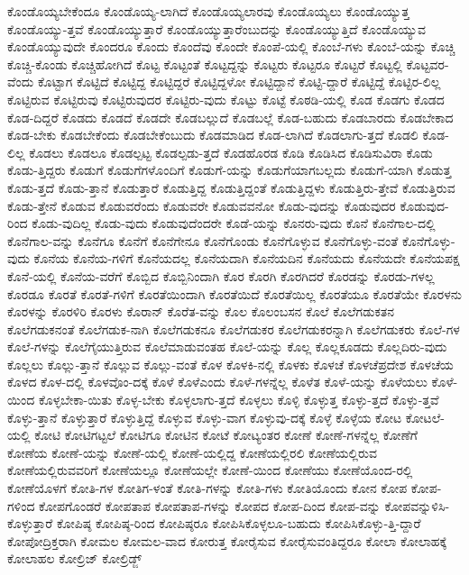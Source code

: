 {ಕೊಂಡೊಯ್ಯಬೇಕೆಂದೂ
ಕೊಂಡೊಯ್ಯ-ಲಾಗಿದೆ
ಕೊಂಡೊಯ್ಯಲಾರವು
ಕೊಂಡೊಯ್ಯಲು
ಕೊಂಡೊಯ್ಯುತ್ತ
ಕೊಂಡೊಯ್ಯು-ತ್ತವೆ
ಕೊಂಡೊಯ್ಯುತ್ತಾರೆ
ಕೊಂಡೊಯ್ಯುತ್ತಾರೆಂಬುದನ್ನು
ಕೊಂಡೊಯ್ಯುತ್ತಿದೆ
ಕೊಂಡೊಯ್ಯುವ
ಕೊಂಡೊಯ್ಯುವುದೇ
ಕೊಂದರೂ
ಕೊಂದು
ಕೊಂದೆವು
ಕೊಂದೇ
ಕೊಂಪೆ-ಯಲ್ಲಿ
ಕೊಂಬೆ-ಗಳು
ಕೊಂಬೆ-ಯನ್ನು
ಕೊಚ್ಚಿ
ಕೊಚ್ಚಿ-ಕೊಂಡು
ಕೊಚ್ಚಿಹೋಗಿದೆ
ಕೊಟ್ಟ
ಕೊಟ್ಟಂತೆ
ಕೊಟ್ಟದ್ದನ್ನು
ಕೊಟ್ಟರು
ಕೊಟ್ಟರೂ
ಕೊಟ್ಟರೆ
ಕೊಟ್ಟಲ್ಲಿ
ಕೊಟ್ಟವರ-ವೆಂದು
ಕೊಟ್ಟಾಗ
ಕೊಟ್ಟಿದೆ
ಕೊಟ್ಟಿದ್ದ
ಕೊಟ್ಟಿದ್ದರೆ
ಕೊಟ್ಟಿದ್ದಳೋ
ಕೊಟ್ಟಿದ್ದಾನೆ
ಕೊಟ್ಟಿ-ದ್ದಾರೆ
ಕೊಟ್ಟಿದ್ದೆ
ಕೊಟ್ಟಿರ-ಲಿಲ್ಲ
ಕೊಟ್ಟಿರುವ
ಕೊಟ್ಟಿರುವು
ಕೊಟ್ಟಿರುವುದರ
ಕೊಟ್ಟಿರು-ವುದು
ಕೊಟ್ಟು
ಕೊಟ್ಟೆ
ಕೊಠಡಿ-ಯಲ್ಲಿ
ಕೊಡ
ಕೊಡಗು
ಕೊಡದ
ಕೊಡ-ದಿದ್ದರೆ
ಕೊಡದು
ಕೊಡದೆ
ಕೊಡದೇ
ಕೊಡಬಲ್ಲುದೆ
ಕೊಡಬಲ್ಲೆ
ಕೊಡ-ಬಹುದು
ಕೊಡಬಾರದು
ಕೊಡಬೇಕಾದ
ಕೊಡ-ಬೇಕು
ಕೊಡಬೇಕೆಂದು
ಕೊಡಬೇಕೆಂಬುದು
ಕೊಡಮಾಡಿದ
ಕೊಡ-ಲಾಗಿದೆ
ಕೊಡಲಾಗು-ತ್ತದೆ
ಕೊಡಲಿ
ಕೊಡ-ಲಿಲ್ಲ
ಕೊಡಲು
ಕೊಡಲೂ
ಕೊಡಲ್ಪಟ್ಟ
ಕೊಡಲ್ಪಡು-ತ್ತದೆ
ಕೊಡಹೊರಡ
ಕೊಡಿ
ಕೊಡಿಸಿದ
ಕೊಡಿಸುವಿರಾ
ಕೊಡು
ಕೊಡು-ತ್ತಿದ್ದರು
ಕೊಡುಗೆ
ಕೊಡುಗೆಗಳೊಂದಿಗೆ
ಕೊಡುಗೆ-ಯನ್ನು
ಕೊಡುಗೆಯಾಗಬಲ್ಲದು
ಕೊಡುಗೆ-ಯಾಗಿ
ಕೊಡುತ್ತ
ಕೊಡು-ತ್ತದೆ
ಕೊಡು-ತ್ತಾನೆ
ಕೊಡುತ್ತಾರೆ
ಕೊಡುತ್ತಿದ್ದ
ಕೊಡುತ್ತಿದ್ದಂತೆ
ಕೊಡುತ್ತಿದ್ದಳು
ಕೊಡುತ್ತಿರು-ತ್ತೇವೆ
ಕೊಡುತ್ತಿರುವ
ಕೊಡು-ತ್ತೇನೆ
ಕೊಡುವ
ಕೊಡುವರೆಂದು
ಕೊಡುವರೇ
ಕೊಡುವವನೋ
ಕೊಡು-ವುದನ್ನು
ಕೊಡುವುದರ
ಕೊಡುವುದ-ರಿಂದ
ಕೊಡು-ವುದಿಲ್ಲ
ಕೊಡು-ವುದು
ಕೊಡುವುದೆಂದರೇ
ಕೊಡೆ-ಯನ್ನು
ಕೊನರು-ವುದು
ಕೊನೆ
ಕೊನೆಗಾಲ-ದಲ್ಲಿ
ಕೊನೆಗಾಲ-ವನ್ನು
ಕೊನೆಗೂ
ಕೊನೆಗೆ
ಕೊನೆಗೇನೂ
ಕೊನೆಗೊಂಡು
ಕೊನೆಗೊಳ್ಳುವ
ಕೊನೆಗೊಳ್ಳು-ವಂತೆ
ಕೊನೆಗೊಳ್ಳು-ವುದು
ಕೊನೆಯ
ಕೊನೆಯ-ಗಳಿಗೆ
ಕೊನೆಯದಲ್ಲ
ಕೊನೆಯದಾಗಿ
ಕೊನೆಯದಿನ
ಕೊನೆಯದು
ಕೊನೆಯದೇ
ಕೊನೆಯಪಕ್ಷ
ಕೊನೆ-ಯಲ್ಲಿ
ಕೊನೆಯ-ವರೆಗೆ
ಕೊಬ್ಬಿದ
ಕೊಬ್ಬಿನಿಂದಾಗಿ
ಕೊರ
ಕೊರಗಿ
ಕೊರಗಿದರೆ
ಕೊರಡನ್ನು
ಕೊರಡು-ಗಳಲ್ಲ
ಕೊರಡೂ
ಕೊರತೆ
ಕೊರತೆ-ಗಳಿಗೆ
ಕೊರತೆಯಿಂದಾಗಿ
ಕೊರತೆಯಿದೆ
ಕೊರತೆಯಿಲ್ಲ
ಕೊರತೆಯೂ
ಕೊರತೆಯೇ
ಕೊರಳನು
ಕೊರಳನ್ನು
ಕೊರಳಿರಿ
ಕೊರಳು
ಕೊರಾನ್
ಕೊರೆತ-ವನ್ನು
ಕೊಲ
ಕೊಲಂಬಸನ
ಕೊಲೆ
ಕೊಲೆಗಡುಕತನ
ಕೊಲೆಗಡುಕನಂತೆ
ಕೊಲೆಗಡುಕ-ನಾಗಿ
ಕೊಲೆಗಡುಕನೂ
ಕೊಲೆಗಡುಕರ
ಕೊಲೆಗಡುಕರನ್ನಾಗಿ
ಕೊಲೆಗಡುಕರು
ಕೊಲೆ-ಗಳ
ಕೊಲೆ-ಗಳನ್ನು
ಕೊಲೆಗೈಯುತ್ತಿರುವ
ಕೊಲೆಮಾಡುವಂತಹ
ಕೊಲೆ-ಯನ್ನು
ಕೊಲ್ಲ
ಕೊಲ್ಲಕೂಡದು
ಕೊಲ್ಲದಿರು-ವುದು
ಕೊಲ್ಲಲು
ಕೊಲ್ಲು-ತ್ತಾನೆ
ಕೊಲ್ಲುವ
ಕೊಲ್ಲು-ವಂತೆ
ಕೊಳ
ಕೊಳಕಿ-ನಲ್ಲಿ
ಕೊಳಕು
ಕೊಳಚೆ
ಕೊಳಚೆಪ್ರದೇಶ
ಕೊಳಚೆಯ
ಕೊಳದ
ಕೊಳ-ದಲ್ಲಿ
ಕೊಳವೊಂ-ದಕ್ಕೆ
ಕೊಳೆ
ಕೊಳೆಎಂದು
ಕೊಳೆ-ಗಳನ್ನೆಲ್ಲ
ಕೊಳೆತ
ಕೊಳೆ-ಯನ್ನು
ಕೊಳೆಯಲು
ಕೊಳೆ-ಯಿಂದ
ಕೊಳ್ಳಬೇಕಾ-ಯಿತು
ಕೊಳ್ಳ-ಬೇಕು
ಕೊಳ್ಳಲಾಗು-ತ್ತದೆ
ಕೊಳ್ಳಲು
ಕೊಳ್ಳಿ
ಕೊಳ್ಳುತ್ತ
ಕೊಳ್ಳು-ತ್ತದೆ
ಕೊಳ್ಳು-ತ್ತವೆ
ಕೊಳ್ಳು-ತ್ತಾನೆ
ಕೊಳ್ಳುತ್ತಾರೆ
ಕೊಳ್ಳುತ್ತಿದ್ದೆ
ಕೊಳ್ಳುವ
ಕೊಳ್ಳು-ವಾಗ
ಕೊಳ್ಳುವು-ದಕ್ಕೆ
ಕೊಳ್ಳೆ
ಕೊಳ್ಳೆಯ
ಕೋಟ
ಕೋಟಲೆ-ಯಲ್ಲಿ
ಕೋಟಿ
ಕೋಟಿಗಟ್ಟಲೆ
ಕೋಟಿಗೂ
ಕೋಟಿನ
ಕೋಟೆ
ಕೋಟ್ಯಂತರ
ಕೋಣೆ
ಕೋಣೆ-ಗಳನ್ನೆಲ್ಲ
ಕೋಣೆಗೆ
ಕೋಣೆಯ
ಕೋಣೆ-ಯನ್ನು
ಕೋಣೆ-ಯಲ್ಲಿ
ಕೋಣೆ-ಯಲ್ಲಿದ್ದ
ಕೋಣೆಯಲ್ಲಿರಲಿ
ಕೋಣೆಯಲ್ಲಿರುವ
ಕೋಣೆಯಲ್ಲಿರುವವರಿಗೆ
ಕೋಣೆಯಲ್ಲೂ
ಕೋಣೆಯಲ್ಲೇ
ಕೋಣೆ-ಯಿಂದ
ಕೋಣೆಯು
ಕೋಣೆಯೊಂದ-ರಲ್ಲಿ
ಕೋಣೆಯೊಳಗೆ
ಕೋತಿ-ಗಳ
ಕೋತಿಗ-ಳಂತೆ
ಕೋತಿ-ಗಳನ್ನು
ಕೋತಿ-ಗಳು
ಕೋತಿಯೊಂದು
ಕೋನ
ಕೋಪ
ಕೋಪ-ಗಳಿಂದ
ಕೋಪಗೊಂಡರೆ
ಕೋಪತಾಪ
ಕೋಪತಾಪ-ಗಳನ್ನು
ಕೋಪದ
ಕೋಪ-ದಿಂದ
ಕೋಪ-ವನ್ನು
ಕೋಪವನ್ನುಳಿಸಿ-ಕೊಳ್ಳುತ್ತಾರೆ
ಕೋಪಿಷ್ಠ
ಕೋಪಿಷ್ಠ-ರಿಂದ
ಕೋಪಿಷ್ಠರೂ
ಕೋಪಿಸಿಕೊಳ್ಳಲೂ-ಬಹುದು
ಕೋಪಿಸಿಕೊಳ್ಳು-ತ್ತಿ-ದ್ದಾರೆ
ಕೋಪೋದ್ರಿಕ್ತರಾಗಿ
ಕೋಮಲ
ಕೋಮಲ-ವಾದ
ಕೋರುತ್ತ
ಕೋರೈಸುವ
ಕೋರೈಸುವಂತಿದ್ದರೂ
ಕೋಲಾ
ಕೋಲಾಹಕ್ಕೆ
ಕೋಲಾಹಲ
ಕೋಲ್ರಿಜ್
ಕೋಲ್ರಿಡ್ಜ್
}
